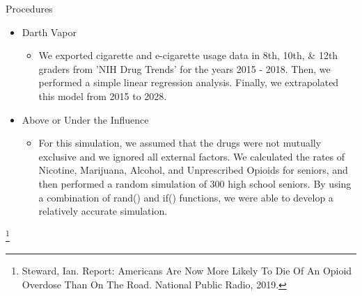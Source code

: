 \documentclass{beamer}
\begin{document}
\begin{frame}{Procedures}
    \begin{itemize}
        \item Darth Vapor
            \begin{itemize}
                \item We exported cigarette and e-cigarette usage data in 8th, 10th, \& 12th graders from 'NIH Drug Trends' for the years 2015 - 2018. Then, we performed a simple linear regression analysis. Finally, we extrapolated this model from 2015 to 2028. 
            \end{itemize}
        \item Above or Under the Influence
            \begin{itemize}
                \item For this simulation, we assumed that the drugs were not mutually exclusive and we ignored all external factors. We calculated the rates of Nicotine, Marijuana, Alcohol, and Unprescribed Opioids for seniors, and then performed a random simulation of 300 high school seniors. By using a combination of rand() and if() functions, we were able to develop a relatively accurate simulation. 
            \end{itemize}
    \end{itemize}
     \footnote{Steward, Ian. Report: Americans Are Now More Likely To Die Of An Opioid Overdose Than On The Road. National Public Radio, 2019.} 
\end{frame}
\end{document}
